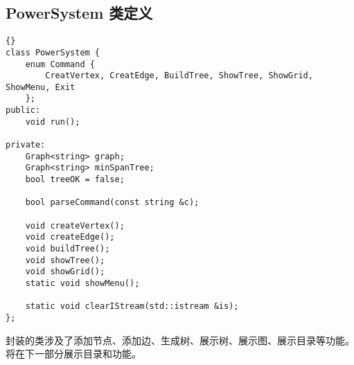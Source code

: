 \subsection{PowerSystem 类定义}
\begin{lstlisting}[firstnumber=986, caption=System 类定义]{}
class PowerSystem {
    enum Command {
        CreatVertex, CreatEdge, BuildTree, ShowTree, ShowGrid, ShowMenu, Exit
    };
public:
    void run();

private:
    Graph<string> graph;
    Graph<string> minSpanTree;
    bool treeOK = false;

    bool parseCommand(const string &c);

    void createVertex();
    void createEdge();
    void buildTree();
    void showTree();
    void showGrid();
    static void showMenu();

    static void clearIStream(std::istream &is);
};
\end{lstlisting}

封装的类涉及了添加节点、添加边、生成树、展示树、展示图、展示目录等功能。将在下一部分展示目录和功能。
